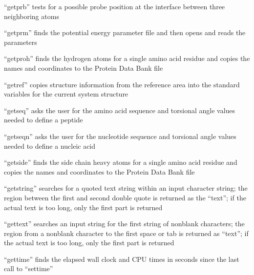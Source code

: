 \documentclass[letterpaper,11pt,english]{sphinxmanual}
\begin{document}

“getprb” tests for a possible probe position at the interface
between three neighboring atoms


“getprm” finds the potential energy parameter file
and then opens and reads the parameters


“getproh” finds the hydrogen atoms for a single amino acid
residue and copies the names and coordinates to the Protein
Data Bank file


“getref” copies structure information from the reference area
into the standard variables for the current system structure


“getseq” asks the user for the amino acid sequence
and torsional angle values needed to define a peptide


“getseqn” asks the user for the nucleotide sequence and
torsional angle values needed to define a nucleic acid


“getside” finds the side chain heavy atoms for a single amino
acid residue and copies the names and coordinates to the Protein
Data Bank file


“getstring” searches for a quoted text string within an input
character string; the region between the first and second
double quote is returned as the “text”; if the actual text is
too long, only the first part is returned


“gettext” searches an input string for the first string of
non\sphinxhyphen{}blank characters; the region from a non\sphinxhyphen{}blank character
to the first space or tab is returned as “text”; if the
actual text is too long, only the first part is returned


“gettime” finds the elapsed wall clock and CPU times in seconds
since the last call to “settime”

\end{document}
